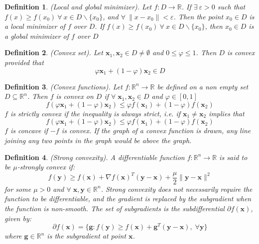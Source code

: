 \documentclass[12pt]{report}
\newtheorem{defn}{Definition}[section]
\numberwithin{equation}{section}
\begin{document}
\begin{defn} 
\normalfont
(Local and global minimizer).
Let $f:D \rightarrow \mathbb{R}$. If $\exists \  \varepsilon > 0$ such that  $f(x) \geq f(x_0) \  \forall \ x \in D\backslash \{x_0\}$, and $\forall \  \|x-x_0\|<\varepsilon$.  Then the point $x_0 \in D$ is a local minimizer of $f$ over $D$. If $f(x) \geq f(x_0) \  \forall \ x \in D\backslash \{x_0\}$, then  $x_0 \in D$ is a global minimizer of $f$ over $D$
\end{defn}
\begin{defn}
\normalfont
(Convex set).
Let $\bm{x}_1,\bm{x}_2 \in D \neq \emptyset$ and $0\leq \varphi \leq 1$. Then $D$ is convex provided that 
\[
\varphi \bm{x}_1 + (1-\varphi)\bm{x}_2 \in D 
\]
\end{defn}
\begin{defn}
\normalfont
(Convex functions).
Let $f:\mathbb{R}^n\rightarrow\mathbb{R}$ be defined on a non empty set $D\subseteq\mathbb{R}^n$. Then $f$ is convex on $D$ if $\forall \; \bm{x}_1,\bm{x}_2 \in D$ and $\varphi \in [0,1]$
\begin{equation}\label{eqn:convex_fxn}
f(\varphi \bm{x}_1 + (1-\varphi)\bm{x}_2) \leq \varphi f(\bm{x}_1) + (1-\varphi)f(\bm{x}_2)
\end{equation}
$f$ is strictly convex if the inequality is always strict, i.e. if $\bm{x}_1\neq \bm{x}_2$ implies that
\begin{equation}\label{eqn:convex_strict}
f(\varphi \bm{x}_1 + (1-\varphi)\bm{x}_2) \leq \varphi f(\bm{x}_1) + (1-\varphi)f(\bm{x}_2)
\end{equation}
$f$ is concave if $-f$ is convex. If the graph of a convex function is drawn, any line joining any two points in the graph would be above the graph. 
\end{defn}
\begin{defn}
\normalfont
(Strong convexity).
A differentiable function $f:\mathbb{R}^n\rightarrow\mathbb{R}$ is said to be $\mu$-strongly convex if:
\begin{equation}\label{eqn:strong_convex}
f(\bm{y}) \geq f(\bm{x}) + \nabla f(\bm{x})^T (\bm{y}-\bm{x}) + \frac{\mu}{2} \| \bm{y}-\bm{x} \|^2
\end{equation}
for some $\mu > 0$ and $\forall \; \bm{x},\bm{y} \in \mathbb{R}^n$. Strong convexity does not necessarily require the function to be differentiable, and the gradient is replaced by the subgradient when the function is non-smooth. The set of subgradients is the subdifferential $\partial f(\bm{x})$, given by: 
\begin{equation}\label{eqn:subgradient}
\partial f(\bm{x}) = \{\bm{g}: f(\bm{y}) \geq f(\bm{x})+ \bm{g}^T (\bm{y}-\bm{x}), \; \forall \bm{y}\}
\end{equation}
where $\bm{g} \in \mathbb{R}^n$ is the subgradient at point $\bm{x}$. 
\end{defn}
\end{document}
